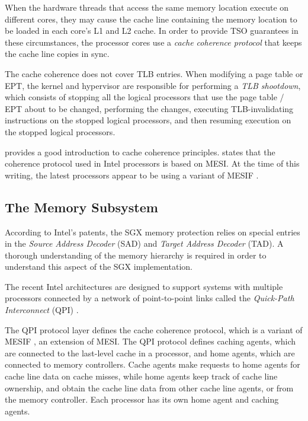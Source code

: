 When the hardware threads that access the same memory location execute on
different cores, they may cause the cache line containing the memory location
to be loaded in each core's L1 and L2 cache. In order to provide TSO guarantees
in these circumstances, the processor cores use a \textit{cache coherence
protocol} that keeps the cache line copies in sync.


The cache coherence does not cover TLB entries. When modifying a page table
or EPT, the kernel and hypervisor are responsible for performing a
\textit{TLB shootdown}, which consists of stopping all the logical processors
that use the page table / EPT about to be changed, performing the changes,
executing TLB-invalidating instructions on the stopped logical processors, and
then resuming execution on the stopped logical processors.

\cite{hennessy2012architecture} provides a good introduction to cache coherence
principles. \cite{intel2014manual} states that the coherence protocol used in
Intel processors is based on MESI. At the time of this writing, the latest
processors appear to be using a variant of
MESIF \cite{goodman2009mesif, ziakas2010qpi, intel2009qpi}.


\subsection{The Memory Subsystem}
\label{sec:uncore}

According to Intel's patents, the SGX memory protection relies on special
entries in the \textit{Source Address Decoder} (SAD) and \textit{Target Address
Decoder} (TAD).  A thorough understanding of the memory hierarchy is required
in order to understand this aspect of the SGX implementation.

The recent Intel architectures are designed to support systems with multiple
processors connected by a network of point-to-point links called the
\textit{Quick-Path Interconnect} (QPI) \cite{intel2009qpi}.

The QPI protocol layer defines the cache coherence protocol, which is a variant
of MESIF \cite{goodman2009mesif}, an extension of MESI. The QPI protocol
defines caching agents, which are connected to the last-level cache in a
processor, and home agents, which are connected to memory controllers. Cache
agents make requests to home agents for cache line data on cache misses, while
home agents keep track of cache line ownership, and obtain the cache line data
from other cache line agents, or from the memory controller. Each processor has
its own home agent and caching agents.

